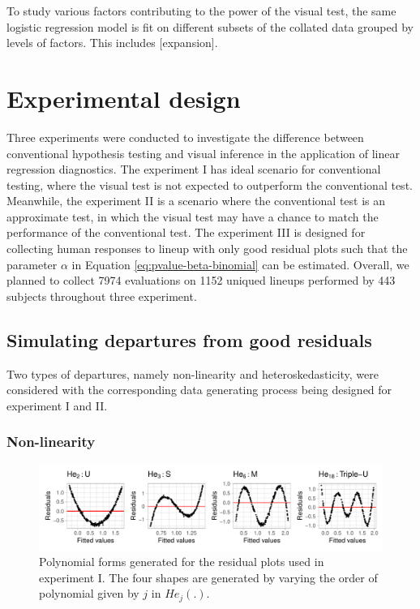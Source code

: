 \documentclass[]{interact}
\theoremstyle{plain}%
\theoremstyle{definition}
\theoremstyle{remark}
\begin{document}
To study various factors contributing to the power of the visual test,
the same logistic regression model is fit on different subsets of the
collated data grouped by levels of factors. This includes
{[}expansion{]}.

\hypertarget{experimental-design}{%
\section{Experimental design}\label{experimental-design}}

Three experiments were conducted to investigate the difference between
conventional hypothesis testing and visual inference in the application
of linear regression diagnostics. The experiment I has ideal scenario
for conventional testing, where the visual test is not expected to
outperform the conventional test. Meanwhile, the experiment II is a
scenario where the conventional test is an approximate test, in which
the visual test may have a chance to match the performance of the
conventional test. The experiment III is designed for collecting human
responses to lineup with only good residual plots such that the
parameter \(\alpha\) in Equation \ref{eq:pvalue-beta-binomial} can be
estimated. Overall, we planned to collect 7974 evaluations on 1152
uniqued lineups performed by 443 subjects throughout three experiment.

\hypertarget{simulating-departures-from-good-residuals}{%
\subsection{Simulating departures from good
residuals}\label{simulating-departures-from-good-residuals}}

Two types of departures, namely non-linearity and heteroskedasticity,
were considered with the corresponding data generating process being
designed for experiment I and II.

\hypertarget{non-linearity}{%
\subsubsection{Non-linearity}\label{non-linearity}}

\begin{figure}

{\centering \includegraphics[width=1\linewidth]{paper_comparison_files/figure-latex/different-shape-of-herimite-1} 

}

\caption{Polynomial forms generated for the residual plots used in experiment I. The four shapes are generated by varying the order of polynomial given by $j$ in $He_j(.)$.}\label{fig:different-shape-of-herimite}
\end{figure}
\end{document}

